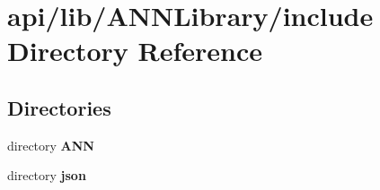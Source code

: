 \section{api/lib/\+A\+N\+N\+Library/include Directory Reference}
\label{dir_595b9c557f0cf17331172f5af150b647}
\subsection*{Directories}
\begin{DoxyCompactItemize}
\item 
directory {\bf A\+N\+N}
\item 
directory {\bf json}
\end{DoxyCompactItemize}
